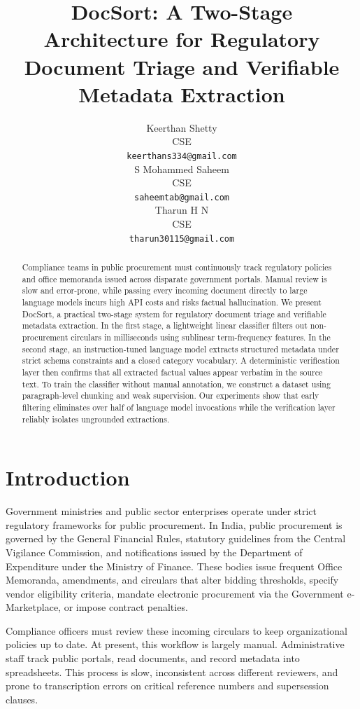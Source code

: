 \documentclass{article}
\title{DocSort: A Two-Stage Architecture for Regulatory Document Triage and Verifiable Metadata Extraction}
\author{
  Keerthan Shetty\\
  CSE \\
  {\footnotesize\texttt{keerthans334@gmail.com}} \\
  \And
  S Mohammed Saheem\\
  CSE \\
  {\footnotesize\texttt{saheemtab@gmail.com}} \\
  \And
  Tharun H N\\
  CSE \\
  {\footnotesize\texttt{tharun30115@gmail.com}} \\
}
\begin{document}
\maketitle

\begin{abstract}
\fontsize{11pt}{14.5pt}\selectfont
Compliance teams in public procurement must continuously track regulatory policies and office memoranda issued across disparate government portals. Manual review is slow and error-prone, while passing every incoming document directly to large language models incurs high API costs and risks factual hallucination. We present DocSort, a practical two-stage system for regulatory document triage and verifiable metadata extraction. In the first stage, a lightweight linear classifier filters out non-procurement circulars in milliseconds using sublinear term-frequency features. In the second stage, an instruction-tuned language model extracts structured metadata under strict schema constraints and a closed category vocabulary. A deterministic verification layer then confirms that all extracted factual values appear verbatim in the source text. To train the classifier without manual annotation, we construct a dataset using paragraph-level chunking and weak supervision. Our experiments show that early filtering eliminates over half of language model invocations while the verification layer reliably isolates ungrounded extractions.
\end{abstract}
\vspace{2.5ex}

\section{Introduction}

Government ministries and public sector enterprises operate under strict regulatory frameworks for public procurement. In India, public procurement is governed by the General Financial Rules, statutory guidelines from the Central Vigilance Commission, and notifications issued by the Department of Expenditure under the Ministry of Finance. These bodies issue frequent Office Memoranda, amendments, and circulars that alter bidding thresholds, specify vendor eligibility criteria, mandate electronic procurement via the Government e-Marketplace, or impose contract penalties.

Compliance officers must review these incoming circulars to keep organizational policies up to date. At present, this workflow is largely manual. Administrative staff track public portals, read documents, and record metadata into spreadsheets. This process is slow, inconsistent across different reviewers, and prone to transcription errors on critical reference numbers and supersession clauses.
\end{document}
